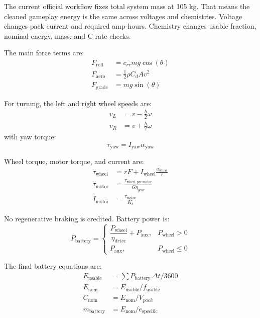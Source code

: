 \documentclass[11pt]{article}
\begin{document}
The current official workflow fixes total system mass at 105 kg. That means the cleaned gameplay energy is the same across voltages and chemistries. Voltage changes pack current and required amp-hours. Chemistry changes usable fraction, nominal energy, mass, and C-rate checks.

The main force terms are:
\begin{align}
F_{\mathrm{roll}} &= c_{rr} m g \cos(\theta) \\
F_{\mathrm{aero}} &= \frac{1}{2} \rho C_dA v^2 \\
F_{\mathrm{grade}} &= m g \sin(\theta)
\end{align}

For turning, the left and right wheel speeds are:
\begin{align}
v_L &= v - \frac{b}{2}\omega \\
v_R &= v + \frac{b}{2}\omega
\end{align}
with yaw torque:
\begin{equation}
\tau_{\mathrm{yaw}} = I_{\mathrm{yaw}}\alpha_{\mathrm{yaw}}
\end{equation}

Wheel torque, motor torque, and current are:
\begin{align}
\tau_{\mathrm{wheel}} &= rF + I_{\mathrm{wheel}}\frac{a_{\mathrm{wheel}}}{r} \\
\tau_{\mathrm{motor}} &= \frac{\tau_{\mathrm{wheel,per\ motor}}}{G\eta_{gear}} \\
I_{\mathrm{motor}} &= \frac{\tau_{\mathrm{motor}}}{K_t}
\end{align}

No regenerative braking is credited. Battery power is:
\begin{equation}
P_{\mathrm{battery}} =
\begin{cases}
\dfrac{P_{\mathrm{wheel}}}{\eta_{drive}} + P_{\mathrm{aux}}, & P_{\mathrm{wheel}} > 0 \\
P_{\mathrm{aux}}, & P_{\mathrm{wheel}} \le 0
\end{cases}
\end{equation}

The final battery equations are:
\begin{align}
E_{\mathrm{usable}} &= \sum P_{\mathrm{battery}}\,\Delta t / 3600 \\
E_{\mathrm{nom}} &= E_{\mathrm{usable}} / f_{\mathrm{usable}} \\
C_{\mathrm{nom}} &= E_{\mathrm{nom}} / V_{pack} \\
m_{\mathrm{battery}} &= E_{\mathrm{nom}} / e_{\mathrm{specific}}
\end{align}
\end{document}
